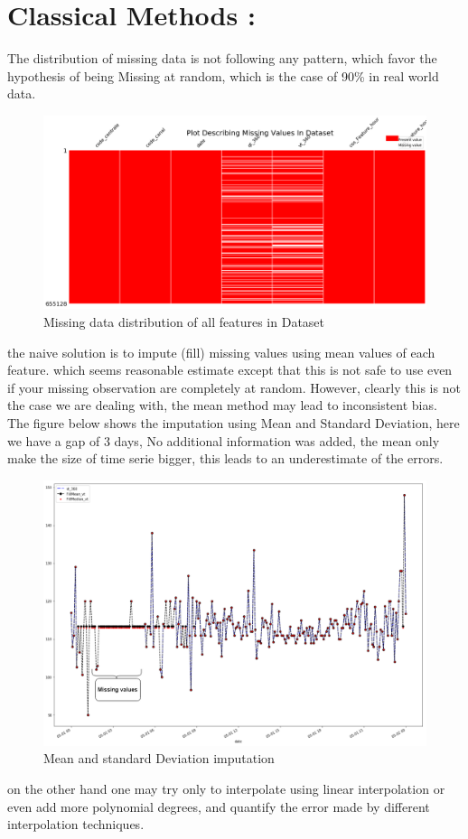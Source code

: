 \section{Classical Methods :}
The distribution of missing data is not following any pattern, which favor the hypothesis of being Missing at random, which is the case of 90\% in real world data.
%
\begin{figure}[H]
\centering
\includegraphics[width=.63\textwidth]{img/missing_values_distributation.png} 
\caption{Missing data distribution of all features in Dataset}
\label{fig:presteps}
\end{figure}
%
the naive solution is to impute (fill) missing values using mean values of each feature. which seems reasonable estimate except that this is not safe to use even if your missing observation are completely at random. However, clearly this is not the case we are dealing with, the mean  method may lead to inconsistent bias.\\The figure below shows the imputation  using Mean and Standard Deviation,  here we have a gap of 3 days, No additional information was added, the mean only make  the size of time serie bigger, this leads to an underestimate of the errors.
%
\begin{figure}[H]
\centering
\includegraphics[scale=.49]{img/mean_median.png} 
\caption{Mean and standard Deviation imputation}
\label{fig:presteps}
\end{figure}
%
on the other hand one may try only to interpolate using linear interpolation or even add more polynomial degrees, and quantify the error made by different interpolation techniques.

